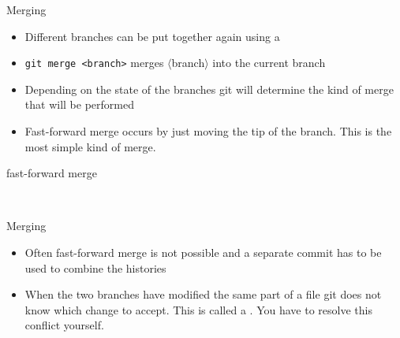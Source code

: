 \documentclass[12pt]{beamer}
\begin{document}
\begin{frame}[fragile]{Merging}
\begin{itemize}
\item Different branches can be put together again using a \textbf{}
\item \texttt{git merge <branch>} merges $\langle$branch$\rangle$ into the current branch
\item Depending on the state of the branches git will determine the kind of merge that will be performed
\item Fast-forward merge occurs by just moving the tip of the branch. This is the most simple kind of merge.
\end{itemize}
\end{frame}



\begin{frame}{fast-forward merge}
	 \begin{figure}
 \begin{subfigure}[b]{\textwidth}
	\centering
\end{subfigure}
\\[3pt]
\begin{subfigure}[b]{\textwidth}
	\centering
\end{subfigure}
\end{figure}
\end{frame}

\begin{frame}[fragile]{Merging}
	\begin{itemize}
		\item Often fast-forward merge is not possible and a separate commit has to be used to combine the histories
		\item When the two branches have modified the same part of a file git does not know which change to accept. This is called a \textbf{}. You have to resolve this conflict yourself. 
	\end{itemize}
\end{frame}
\end{document}
